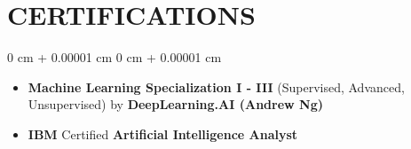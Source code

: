 \documentclass[10pt, letterpaper]{article}
\newenvironment{highlights}{
    \begin{itemize}[
        topsep=0.10 cm,
        parsep=0.10 cm,
        partopsep=0pt,
        itemsep=0pt,
        leftmargin=0 cm + 10pt
    ]
}{
    \end{itemize}
} %
\newenvironment{onecolentry}{
    \begin{adjustwidth}{
        0 cm + 0.00001 cm
    }{
        0 cm + 0.00001 cm
    }
}{
    \end{adjustwidth}
} %
\let\hrefWithoutArrow\href
\begin{document}
    \section{CERTIFICATIONS}

        \begin{onecolentry}
            \begin{highlights}
                \item \textbf{Machine Learning Specialization I - III} (Supervised, Advanced, Unsupervised) by \textbf{DeepLearning.AI (Andrew Ng)}
                \item \textbf{IBM} Certified \textbf{Artificial Intelligence Analyst}
            \end{highlights}
        \end{onecolentry}



\end{document}
